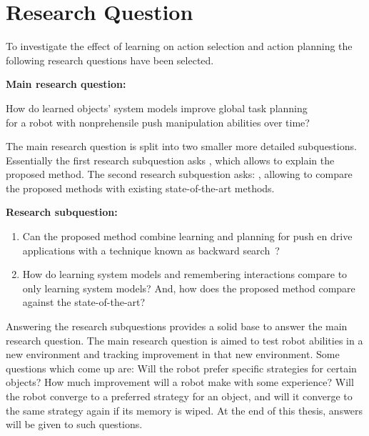 \section{Research Question}%
\label{sec:research_question}
To investigate the effect of learning on action selection and action planning the following research questions have been selected.\bs

\textbf{Main research question:}
\begin{center}%
\label{researchquestion:main}
\large
How do learned objects' system models improve global task planning\\for a robot with nonprehensile push manipulation abilities over time?
\end{center}

The main research question is split into two smaller more detailed subquestions. Essentially the first research subquestion asks , which allows to explain the proposed method. The second research subquestion asks: , allowing to compare the proposed methods with existing state-of-the-art methods.\bs

\textbf{Research subquestion:}
\begin{enumerate}
    \item\label{researchsubquestion:does_it_work} Can the proposed method combine learning and planning for push en drive applications with a technique known as backward search~\cite{krontiris_dealing_2015}?
    \item\label{researchsubquestion:does_it_compare} How do learning system models and remembering interactions compare to only learning system models? And, how does the proposed method compare against the state-of-the-art?
\end{enumerate}

Answering the research subquestions provides a solid base to answer the main research question. The main research question is aimed to test robot abilities in a new environment and tracking improvement in that new environment. Some questions which come up are: Will the robot prefer specific strategies for certain objects? How much improvement will a robot make with some experience? Will the robot converge to a preferred strategy for an object, and will it converge to the same strategy again if its memory is wiped. At the end of this thesis, answers will be given to such questions.\bs


